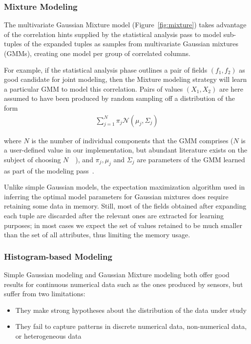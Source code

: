 \subsubsection{Mixture Modeling}
The multivariate Gaussian Mixture model (Figure~\ref{fig:mixture}) takes advantage of the correlation hints supplied by the statistical analysis pass to model sub-tuples of the expanded tuples as samples from multivariate Gaussian mixtures (GMMs), creating one model per group of correlated columns.

For example, if the statistical analysis phase outlines a pair of fields $(f_1, f_2)$ as good candidate for joint modeling, then the Mixture modeling strategy will learn a particular GMM to model this correlation. Pairs of values $(X_1, X_2)$ are here assumed to have been produced by random sampling off a distribution of the form
\begin{align*}
\sum_{j=1}^{N} \pi_j \mathcal N(\mu_j, \Sigma_j)
\end{align*}

where $N$ is the number of individual components that the GMM comprises ($N$ is a user-defined value in our implementation, but abundant literature exists on the subject of choosing $N$~\cite{Schwartz1978}~\cite{Akaike1974}), and $\pi_j, \mu_j$ and $\Sigma_j$ are parameters of the GMM learned as part of the modeling pass~\cite{Dempster1977}.

Unlike simple Gaussian models, the expectation maximization algorithm used in inferring the optimal model parameters for Gaussian mixtures does require retaining some data in memory. Still, most of the fields obtained after expanding each tuple are discarded after the relevant ones are extracted for learning purposes; in most cases we expect the set of values retained to be much smaller than the set of all attributes, thus limiting the memory usage.

\subsubsection{Histogram-based Modeling}
\label{sec:histograms}
Simple Gaussian modeling and Gaussian Mixture modeling both offer good results for continuous numerical data such as the ones produced by sensors, but suffer from two limitations:

\begin{itemize}
\item They make strong hypotheses about the distribution of the data under study
\item They fail to capture patterns in discrete numerical data, non-numerical data, or heterogeneous data
\end{itemize}

